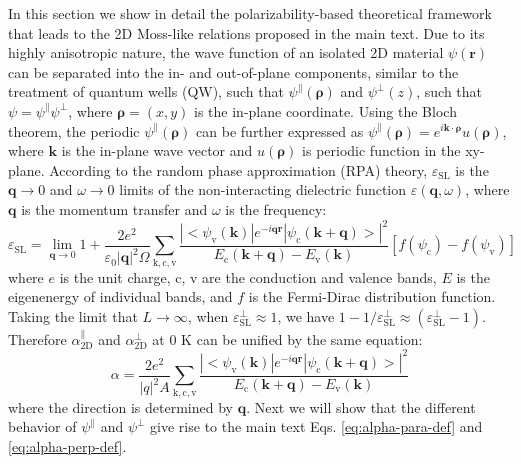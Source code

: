 \documentclass[manuscript=suppinfo,email=true,hyperref=true,keywords=false]{achemso}
\begin{document}
In this section we show in detail the polarizability-based theoretical
framework that leads to the 2D Moss-like relations proposed in the
main text.  Due to its highly anisotropic nature, the wave function of
an isolated 2D material $\psi(\mathbf{r})$ can be separated into the
in- and out-of-plane components, similar to the treatment of quantum
wells (QW),\cite{davies_physics_1997} such that
$\psi^{\parallel}(\boldsymbol{\rho})$ and $\psi^{\perp}(z)$, such that
$\psi=\psi^{\parallel}\psi^{\perp}$, where $\boldsymbol{\rho}=(x, y)$
is the in-plane coordinate. Using the Bloch theorem, the periodic
$\psi^{\parallel}(\boldsymbol{\rho})$ can be further expressed as
$\psi^{\parallel}(\boldsymbol{\rho})=e^{i\mathbf{k} \cdot
  \boldsymbol{\rho}}u(\boldsymbol{\rho})$, where $\mathbf{k}$ is the
in-plane wave vector and $u(\boldsymbol{\rho})$ is periodic function
in the xy-plane. According to the random phase approximation (RPA)
theory\cite{Adler_1962}, $\varepsilon_{\mathrm{SL}}$ is the
$\mathbf{q} \to 0$ and $\omega \to 0$ limits of the non-interacting
dielectric function $\varepsilon(\mathbf{q}, \omega)$, where
$\mathbf{q}$ is the momentum transfer and $\omega$ is the frequency:
\begin{equation}
  \label{eq:RPA-eps2}
  \varepsilon_{\mathrm{SL}}
  = \lim_{\mathbf{q} \to 0} 1 + \frac{2e^{2}}{\varepsilon_{0} |\mathbf{q}|^{2} \Omega}
  \sum_{\mathrm{k, c, v}}
  \frac{|<\psi_{\mathrm{v}}(\mathbf{k})|e^{-i\mathbf{q}\mathbf{r}}|\psi_{\mathrm{c}}(\mathbf{k+q})>|^{2}}
  {E_{\mathrm{c}}(\mathbf{k+q}) - E_{\mathrm{v}}(\mathbf{k})}
  \left[f(\psi_{\mathrm{c}}) - f(\psi_{\mathrm{v}})\right]
\end{equation}
where $e$ is the unit charge, c, v are the conduction and valence
bands, $E$ is the eigenenergy of individual bands, and $f$ is the
Fermi-Dirac distribution function. Taking the
limit that $L\to\infty$, when
$\varepsilon^{\perp}_{\mathrm{SL}} \approx 1$, we have
$1-1/\varepsilon^{\perp}_{\mathrm{SL}} \approx
(\varepsilon_{\mathrm{SL}}^{\perp} - 1)$. Therefore
$\alpha_{\mathrm{2D}}^{\parallel}$ and $\alpha_{\mathrm{2D}}^{\perp}$
at 0 K can be unified by the same equation:
\begin{equation}
  \label{eq:alpha-RPA}
  \alpha = \frac{2e^{2}}{|q|^{2}A} \sum_{\mathrm{k,c,v}}
  \frac{|<\psi_{\mathrm{v}}(\mathbf{k})|e^{-i\mathbf{q}\mathbf{r}}|\psi_{\mathrm{c}}(\mathbf{k+q})>|^{2}}
  {E_{\mathrm{c}}(\mathbf{k+q}) - E_{\mathrm{v}}(\mathbf{k})}
\end{equation}
where the direction is determined by $\mathbf{q}$. Next we will show
that the different behavior of $\psi^{\parallel}$ and $\psi^{\perp}$
give rise to the main text Eqs. \ref{eq:alpha-para-def} and \ref{eq:alpha-perp-def}. 
\end{document}
